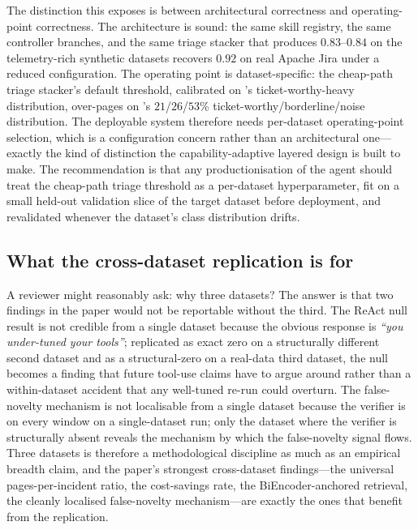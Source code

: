 The distinction this exposes is between architectural correctness and operating-point correctness. The architecture is sound: the same skill registry, the same controller branches, and the same triage stacker that produces $0.83$--$0.84$ on the telemetry-rich synthetic datasets recovers $0.92$ on real Apache Jira under a reduced configuration. The operating point is dataset-specific: the cheap-path triage stacker's default threshold, calibrated on \dsob{}'s ticket-worthy-heavy distribution, over-pages on \dswol{}'s $21$/$26$/$53$\% ticket-worthy/borderline/noise distribution. The deployable system therefore needs per-dataset operating-point selection, which is a configuration concern rather than an architectural one---exactly the kind of distinction the capability-adaptive layered design is built to make. The recommendation is that any productionisation of the agent should treat the cheap-path triage threshold as a per-dataset hyperparameter, fit on a small held-out validation slice of the target dataset before deployment, and revalidated whenever the dataset's class distribution drifts.

\subsection{What the cross-dataset replication is for}
\label{sec:discussion:why3}

A reviewer might reasonably ask: why three datasets? The answer is that two findings in the paper would not be reportable without the third. The ReAct null result is not credible from a single dataset because the obvious response is \emph{``you under-tuned your tools''}; replicated as exact zero on a structurally different second dataset and as a structural-zero on a real-data third dataset, the null becomes a finding that future tool-use claims have to argue around rather than a within-dataset accident that any well-tuned re-run could overturn. The false-novelty mechanism is not localisable from a single dataset because the verifier is on every window on a single-dataset run; only the dataset where the verifier is structurally absent reveals the mechanism by which the false-novelty signal flows. Three datasets is therefore a methodological discipline as much as an empirical breadth claim, and the paper's strongest cross-dataset findings---the universal pages-per-incident ratio, the cost-savings rate, the BiEncoder-anchored retrieval, the cleanly localised false-novelty mechanism---are exactly the ones that benefit from the replication.

